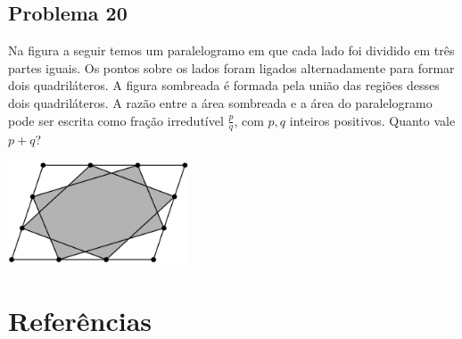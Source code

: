 \documentclass[12pt]{article}
\begin{document}
\clearpage

\subsection{Problema 20}
\begin{tcolorbox}[statementbox]
Na figura a seguir temos um paralelogramo em que cada lado foi dividido em três partes iguais. Os pontos sobre os lados foram
ligados alternadamente para formar dois quadriláteros. A figura sombreada é formada pela união das regiões desses dois quadriláteros.
A razão entre a área sombreada e a área do paralelogramo pode ser escrita como fração irredutível \(\tfrac{p}{q}\), com \(p,q\)
inteiros positivos. Quanto vale \(p+q\)?
\begin{center}
  \includegraphics[width=0.4\textwidth]{sixth.png}
\end{center}
\end{tcolorbox}

  \clearpage

  \section{\textsf{Referências}}
\end{document}
